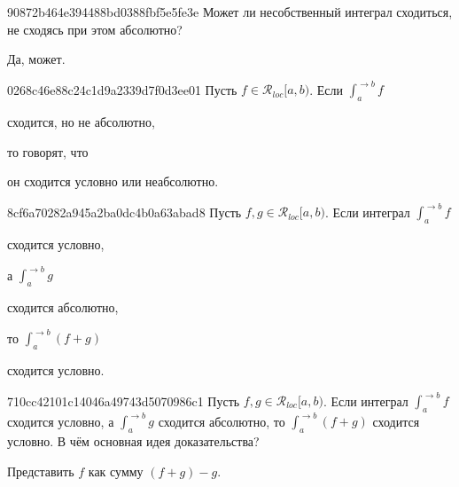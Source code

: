 \begin{note}{90872b464e394488bd0388fbf5e5fe3e}
    Может ли несобственный интеграл сходиться, не сходясь при этом абсолютно?

    \begin{cloze}{1}
        Да, может.
    \end{cloze}
\end{note}

\begin{note}{0268c46e88c24c1d9a2339d7f0d3ee01}
    Пусть \({ f \in \mathcal R_{loc}[a, b) }\).
    Если \({ \int_{a}^{\to b} f }\) \begin{icloze}{2}сходится, но не абсолютно,\end{icloze} то говорят, что \begin{icloze}{1}он сходится условно или неабсолютно.\end{icloze}
\end{note}

\begin{note}{8cf6a70282a945a2ba0dc4b0a63abad8}
    Пусть \({ f, g \in \mathcal R_{loc}[a, b) }\).
    Если интеграл \({ \int_{a}^{\to b} f }\) \begin{icloze}{2}сходится условно,\end{icloze} а \({ \int_{a}^{\to b} g }\) \begin{icloze}{2}сходится абсолютно,\end{icloze} то \({ \int_{a}^{\to b} (f + g) }\) \begin{icloze}{1}сходится условно.\end{icloze}
\end{note}

\begin{note}{710cc42101c14046a49743d5070986c1}
    Пусть \({ f, g \in \mathcal R_{loc}[a, b) }\).
    Если интеграл \({ \int_{a}^{\to b} f }\) сходится условно, а \({ \int_{a}^{\to b} g }\) сходится абсолютно, то \({ \int_{a}^{\to b} (f + g) }\) сходится условно.
    В чём основная идея доказательства?

    \begin{cloze}{1}
        Представить \({ f }\) как сумму \({ (f + g) - g }\).
    \end{cloze}
\end{note}

